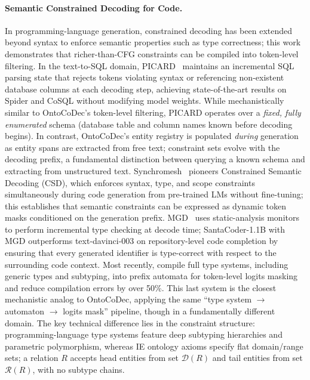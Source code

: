 \paragraph{Semantic Constrained Decoding for Code.}
In programming-language generation, constrained decoding has been extended beyond syntax to enforce semantic properties such as type correctness; this work demonstrates that richer-than-CFG constraints can be compiled into token-level filtering.
In the text-to-SQL domain, PICARD~\cite{scholak2021picard} maintains an incremental SQL parsing state that rejects tokens violating syntax or referencing non-existent database columns at each decoding step, achieving state-of-the-art results on Spider and CoSQL without modifying model weights.
While mechanistically similar to OntoCoDec's token-level filtering, PICARD operates over a \emph{fixed, fully enumerated} schema (database table and column names known before decoding begins).
In contrast, OntoCoDec's entity registry is populated \emph{during} generation as entity spans are extracted from free text; constraint sets evolve with the decoding prefix, a fundamental distinction between querying a known schema and extracting from unstructured text.
Synchromesh~\cite{synchromesh_iclr2022} pioneers Constrained Semantic Decoding (CSD), which enforces syntax, type, and scope constraints simultaneously during code generation from pre-trained LMs without fine-tuning; this establishes that semantic constraints can be expressed as dynamic token masks conditioned on the generation prefix.
MGD~\cite{mgd_neurips2023} uses static-analysis monitors to perform incremental type checking at decode time; SantaCoder-1.1B with MGD outperforms text-davinci-003 on repository-level code completion by ensuring that every generated identifier is type-correct with respect to the surrounding code context.
Most recently, \citet{pldi2025_type_constrained_codegen} compile full type systems, including generic types and subtyping, into prefix automata for token-level logits masking and reduce compilation errors by over 50\%.
This last system is the closest mechanistic analog to OntoCoDec, applying the same ``type system $\to$ automaton $\to$ logits mask'' pipeline, though in a fundamentally different domain.
The key technical difference lies in the constraint structure: programming-language type systems feature deep subtyping hierarchies and parametric polymorphism, whereas IE ontology axioms specify flat domain/range sets; a relation $R$ accepts head entities from set $\mathcal{D}(R)$ and tail entities from set $\mathcal{R}(R)$, with no subtype chains.
